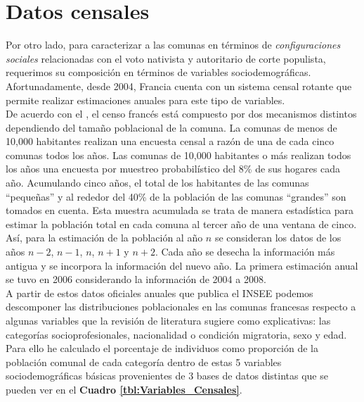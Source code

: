 \section{Datos censales}

Por otro lado, para caracterizar a las comunas en términos de \textit{configuraciones sociales} relacionadas con el voto nativista y autoritario de corte populista, requerimos su composición en términos de variables sociodemográficas. Afortunadamente, desde 2004, Francia cuenta con un sistema censal rotante que permite realizar estimaciones anuales para este tipo de variables.\\ 

De acuerdo con el \textcite{FichaCenso}, el censo francés está compuesto por dos mecanismos distintos dependiendo del tamaño poblacional de la comuna. La comunas de menos de 10,000 habitantes realizan una encuesta censal a razón de una de cada cinco comunas todos los años. Las comunas de 10,000 habitantes o más realizan todos los años una encuesta por muestreo probabilístico del 8\% de sus hogares cada año. Acumulando cinco años, el total de los habitantes de las comunas ``pequeñas'' y al rededor del 40\% de la población de las comunas ``grandes'' son tomados en cuenta. Esta muestra acumulada se trata de manera estadística para estimar la población total en cada comuna al tercer año de una ventana de cinco. Así, para la estimación de la población al año $n$ se consideran los datos de los años $n-2$, $n-1$, $n$, $n+1$ y $n+2$. Cada año se desecha la información más antigua y se incorpora la información del nuevo año.  La primera estimación anual se tuvo en 2006 considerando la información de 2004 a 2008.\\

A partir de estos datos oficiales anuales que publica el INSEE podemos descomponer las distribuciones poblacionales en las comunas francesas respecto a algunas variables que la revisión de literatura sugiere como explicativas: las categorías socioprofesionales, nacionalidad o condición migratoria, sexo y edad. Para ello he calculado el porcentaje de individuos como proporción de la población comunal de cada categoría dentro de estas 5 variables sociodemográficas básicas provenientes de 3 bases de datos distintas que se pueden ver en el \textbf{Cuadro \ref{tbl:Variables_Censales}}.\\ 

